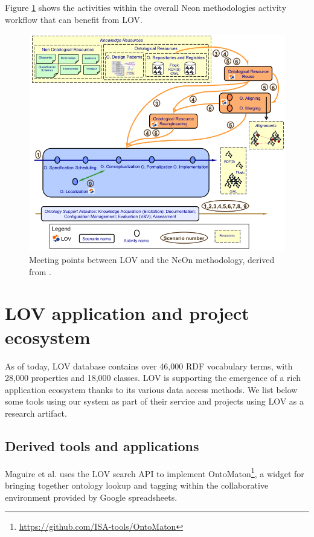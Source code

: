 \documentclass{iosart2c}
\begin{document}
Figure \ref{fig:LOVandNeOn} shows the activities within the overall Neon methodologies activity workflow that can benefit from LOV.
\begin{figure}[h!tp]
\centering
  \includegraphics[width=.95\linewidth]{neonScenarios.png}
  \caption{Meeting points between LOV and the NeOn methodology, derived from \cite{MC10}.}
  \label{fig:LOVandNeOn}
\end{figure}

\section{LOV application and project ecosystem}
\label{sec:lovecosystem}
As of today, LOV database contains over 46,000 RDF vocabulary terms, with 28,000 properties and 18,000 classes. LOV is supporting the emergence of a rich application ecosystem thanks to its various data access methods. We list below some tools using our system as part of their service and projects using LOV as a research artifact.
 
\subsection{Derived tools and applications}

Maguire et al. \cite{ontomaton12} uses the LOV search API to implement OntoMaton\footnote{\url{https://github.com/ISA-tools/OntoMaton}}, a widget for bringing together ontology lookup and tagging within the collaborative environment provided by Google spreadsheets. 
\end{document}
